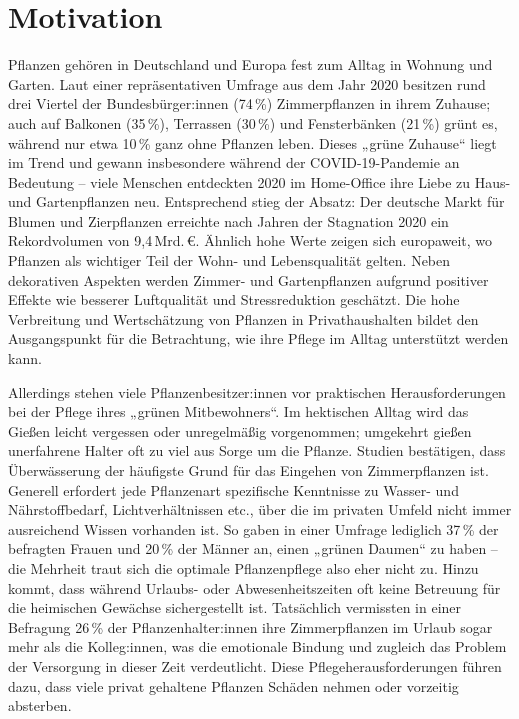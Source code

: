 \section{Motivation}
\label{sec:Motivation}

Pflanzen gehören in Deutschland und Europa fest zum Alltag in Wohnung und Garten. Laut einer repräsentativen Umfrage aus dem Jahr 2020 besitzen rund drei Viertel der Bundesbürger:innen (74\,\%) Zimmerpflanzen in ihrem Zuhause; auch auf Balkonen (35\,\%), Terrassen (30\,\%) und Fensterbänken (21\,\%) grünt es, während nur etwa 10\,\% ganz ohne Pflanzen leben\autocite{pflanzenbesitz_de}. Dieses „grüne Zuhause“ liegt im Trend und gewann insbesondere während der COVID-19-Pandemie an Bedeutung – viele Menschen entdeckten 2020 im Home-Office ihre Liebe zu Haus- und Gartenpflanzen neu\autocite{pflanzenbesitz_de}. Entsprechend stieg der Absatz: Der deutsche Markt für Blumen und Zierpflanzen erreichte nach Jahren der Stagnation 2020 ein Rekordvolumen von 9{,}4\,Mrd.\,€\autocite{stihl_gartenbarometer}. Ähnlich hohe Werte zeigen sich europaweit, wo Pflanzen als wichtiger Teil der Wohn- und Lebensqualität gelten. Neben dekorativen Aspekten werden Zimmer- und Gartenpflanzen aufgrund positiver Effekte wie besserer Luftqualität und Stressreduktion geschätzt\autocite{pflanzenbesitz_de}. Die hohe Verbreitung und Wertschätzung von Pflanzen in Privathaushalten bildet den Ausgangspunkt für die Betrachtung, wie ihre Pflege im Alltag unterstützt werden kann.

Allerdings stehen viele Pflanzenbesitzer:innen vor praktischen Herausforderungen bei der Pflege ihres „grünen Mitbewohners“. Im hektischen Alltag wird das Gießen leicht vergessen oder unregelmäßig vorgenommen; umgekehrt gießen unerfahrene Halter oft zu viel aus Sorge um die Pflanze. Studien bestätigen, dass Überwässerung der häufigste Grund für das Eingehen von Zimmerpflanzen ist\autocite{pflanzenpflege_fehler}. Generell erfordert jede Pflanzenart spezifische Kenntnisse zu Wasser- und Nährstoffbedarf, Lichtverhältnissen etc., über die im privaten Umfeld nicht immer ausreichend Wissen vorhanden ist. So gaben in einer Umfrage lediglich 37\,\% der befragten Frauen und 20\,\% der Männer an, einen „grünen Daumen“ zu haben\autocite{pflanzenbesitz_de} – die Mehrheit traut sich die optimale Pflanzenpflege also eher nicht zu. Hinzu kommt, dass während Urlaubs- oder Abwesenheitszeiten oft keine Betreuung für die heimischen Gewächse sichergestellt ist. Tatsächlich vermissten in einer Befragung 26\,\% der Pflanzenhalter:innen ihre Zimmerpflanzen im Urlaub sogar mehr als die Kolleg:innen\autocite{pflanzenbesitz_de}, was die emotionale Bindung und zugleich das Problem der Versorgung in dieser Zeit verdeutlicht. Diese Pflegeherausforderungen führen dazu, dass viele privat gehaltene Pflanzen Schäden nehmen oder vorzeitig absterben.

